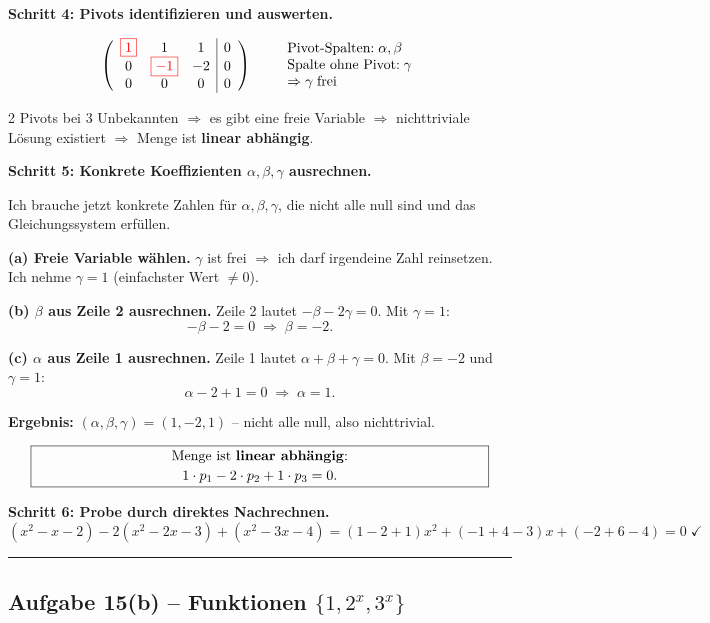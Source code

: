 \documentclass[a4paper,12pt]{article}
\newcommand{\piv}[1]{{\color{red}\boxed{#1}}}
\begin{document}
\textbf{Schritt 4: Pivots identifizieren und auswerten.}

\[
\left(\begin{array}{ccc|c}
\piv{1} & 1 & 1 & 0 \\
0 & \piv{-1} & -2 & 0 \\
0 & 0 & 0 & 0
\end{array}\right)
\qquad
\begin{array}{l}
\text{Pivot-Spalten:}\; \alpha, \beta \\
\text{Spalte ohne Pivot:}\; \gamma \\
\Rightarrow \gamma \;\text{frei}
\end{array}
\]

2 Pivots bei 3 Unbekannten $\Rightarrow$ es gibt eine freie Variable $\Rightarrow$ nichttriviale L\"osung existiert $\Rightarrow$ Menge ist \textbf{linear abh\"angig}.

\medskip

\textbf{Schritt 5: Konkrete Koeffizienten $\alpha, \beta, \gamma$ ausrechnen.}

Ich brauche jetzt konkrete Zahlen f\"ur $\alpha, \beta, \gamma$, die nicht alle null sind und das Gleichungssystem erf\"ullen.

\textbf{(a) Freie Variable w\"ahlen.} $\gamma$ ist frei $\Rightarrow$ ich darf irgendeine Zahl reinsetzen. Ich nehme $\gamma = 1$ (einfachster Wert $\neq 0$).

\textbf{(b) $\beta$ aus Zeile 2 ausrechnen.} Zeile 2 lautet $-\beta - 2\gamma = 0$. Mit $\gamma = 1$:
\[
-\beta - 2 = 0 \;\Rightarrow\; \beta = -2.
\]

\textbf{(c) $\alpha$ aus Zeile 1 ausrechnen.} Zeile 1 lautet $\alpha + \beta + \gamma = 0$. Mit $\beta = -2$ und $\gamma = 1$:
\[
\alpha - 2 + 1 = 0 \;\Rightarrow\; \alpha = 1.
\]

\textbf{Ergebnis:} $(\alpha, \beta, \gamma) = (1, -2, 1)$ -- nicht alle null, also nichttrivial.

\[
\fbox{\parbox{0.93\textwidth}{\centering
Menge ist \textbf{linear abh\"angig}:\\[2pt]
$1 \cdot p_1 - 2 \cdot p_2 + 1 \cdot p_3 = 0.$
}}
\]

\textbf{Schritt 6: Probe durch direktes Nachrechnen.}
\[
(x^2 - x - 2) - 2(x^2 - 2x - 3) + (x^2 - 3x - 4)
= (1-2+1)x^2 + (-1+4-3)x + (-2+6-4) = 0 \;\checkmark
\]

\bigskip
\hrule
\bigskip

\subsection*{Aufgabe 15(b) -- Funktionen $\{1, 2^x, 3^x\}$}
\end{document}
